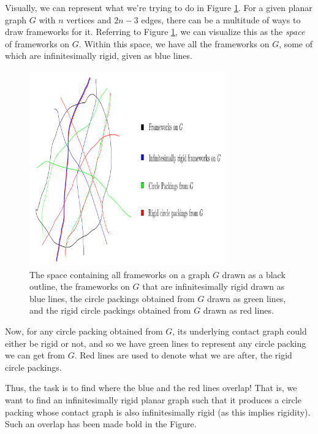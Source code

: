 \begin{flushleft}
    Visually, we can represent what we're trying to do in Figure \ref{fig4: config space}. For a given planar graph $G$ with $n$ vertices and $2n - 3$ edges, there can be a multitude of ways to draw frameworks for it. Referring to Figure \ref{fig4: config space}, we can visualize this as the \textit{space} of frameworks on $G$. Within this space, we have all the frameworks on $G$, some of which are infinitesimally rigid, given as blue lines.  
\end{flushleft}

\begin{figure}[htbp]
    \centering
    \includegraphics[width = 0.75\textwidth]{Chapter 4/5. configuration space.png}
    \caption{The space containing all frameworks on a graph $G$ drawn as a black outline, the frameworks on $G$ that are infinitesimally rigid drawn as blue lines, the circle packings obtained from $G$ drawn as green lines, and the rigid circle packings obtained from $G$ drawn as red lines.}
    \label{fig4: config space}
\end{figure}
\vspace{-4mm}
\begin{flushleft}
Now, for any circle packing obtained from $G$, its underlying contact graph could either be rigid or not, and so we have green lines to represent any circle packing we can get from $G$. Red lines are used to denote what we are after, the rigid circle packings. 
\end{flushleft}

\begin{flushleft}
Thus, the task is to find where the blue and the red lines overlap! That is, we want to find an infinitesimally rigid planar graph such that it produces a circle packing whose contact graph is also infinitesimally rigid (as this implies rigidity). Such an overlap has been made bold in the Figure. 
\end{flushleft}

